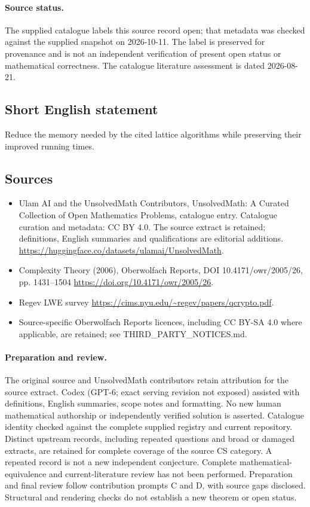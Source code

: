 \documentclass[11pt]{article}
\begin{document}
\paragraph{Source status.}
The supplied catalogue labels this source record open; that metadata was checked against the supplied snapshot on 2026-10-11. The label is preserved for provenance and is not an independent verification of present open status or mathematical correctness. The catalogue literature assessment is dated 2026-08-21.
\subsection{Short English statement}
Reduce the memory needed by the cited lattice algorithms while preserving their improved running times.
\subsection{Sources}
\begin{itemize}
\item[S1] Ulam AI and the UnsolvedMath Contributors, UnsolvedMath: A Curated Collection of Open Mathematics Problems, catalogue entry. Catalogue curation and metadata: CC BY 4.0. The source extract is retained; definitions, English summaries and qualifications are editorial additions.
\url{https://huggingface.co/datasets/ulamai/UnsolvedMath}.
\item[S2] Complexity Theory (2006), Oberwolfach Reports, DOI 10.4171/owr/2005/26, pp. 1431--1504
\url{https://doi.org/10.4171/owr/2005/26}.
\item[S3] Regev LWE survey
\url{https://cims.nyu.edu/~regev/papers/qcrypto.pdf}.
\item Source-specific Oberwolfach Reports licences, including CC BY-SA 4.0 where applicable, are retained; see THIRD\_PARTY\_NOTICES.md.
\end{itemize}
\paragraph{Preparation and review.}
The original source and UnsolvedMath contributors retain attribution for the source extract. Codex (GPT-6; exact serving revision not exposed) assisted with definitions, English summaries, scope notes and formatting. No new human mathematical authorship or independently verified solution is asserted. Catalogue identity checked against the complete supplied registry and current repository. Distinct upstream records, including repeated questions and broad or damaged extracts, are retained for complete coverage of the source CS category. A repeated record is not a new independent conjecture. Complete mathematical-equivalence and current-literature review has not been performed. Preparation and final review follow contribution prompts C and D, with source gaps disclosed. Structural and rendering checks do not establish a new theorem or open status.
\label{end:statement}
\end{document}
